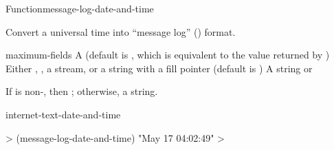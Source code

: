 \documentclass[10pt,twoside,english,pdftex]{article}
\begin{document}
\begin{functiondoc}{Function}{message-log-date-and-time}{%
      
    \returns{} }
% 

\fnsyntax

\fnpurpose Convert a universal time into ``message log''
() format.

\fnpackage {}

\fnmodule {}

\fnargs
\begin{args}{maximum-fields}
 A  (default is \nil,
  which is equivalent to the value returned by
  )
\arg[destination] Either \nil, , a stream, or a string with a fill 
pointer (default is \nil)
\arg[result] A string or \nil{}
\end{args}

\fnreturns If  is non-\nil, then \nil; otherwise, a string.

\begin{alsos}{internet-text-date-and-time}
\end{alsos}

\fnexample
%
\W\supp
\begin{example}
  > (message-log-date-and-time)
  "May 17 04:02:49"
  >
\end{example}

\end{functiondoc}

\end{document}
